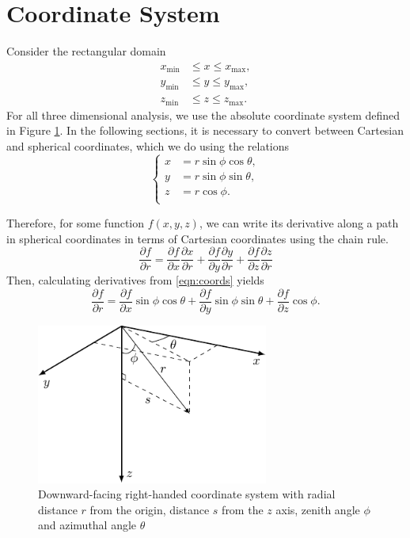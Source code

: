 \documentclass[ms,cpyr,lof,lot]{uathesis}
\newcommand\xmin{{x_{\min}}}
\newcommand\xmax{{x_{\max}}}
\newcommand\ymin{{y_{\min}}}
\newcommand\ymax{{y_{\max}}}
\newcommand\zmin{{z_{\min}}}
\newcommand\zmax{{z_{\max}}}
\begin{document}
\section{Coordinate System}
Consider the rectangular domain
\begin{align*}
  \xmin &\leq x \leq \xmax, \\
  \ymin &\leq y \leq \ymax, \\
  \zmin &\leq z \leq \zmax.
\end{align*}
For all three dimensional analysis, we use the absolute coordinate system defined in Figure \ref{fig:3dcoords}.
In the following sections, it is necessary to convert between Cartesian and spherical coordinates, which we do using the relations
\begin{equation}
  \left\{
	\begin{split}
		x & = r\sin\phi\cos\theta, \\
		y & = r\sin\phi\sin\theta, \\
		z & = r\cos\phi. \\
	\end{split}
  \right.
	\label{eqn:coords}
\end{equation}

Therefore, for some function $f(x,y,z)$, we can write its derivative along a path in spherical coordinates in terms of Cartesian coordinates using the chain rule.
\begin{equation*}
	\frac{\partial f}{\partial r} 
	=\frac{\partial f}{\partial x}\frac{\partial x}{\partial r} 
	+ \frac{\partial f}{\partial y}\frac{\partial y}{\partial r} 
	+ \frac{\partial f}{\partial z}\frac{\partial z}{\partial r}
\end{equation*}
Then, calculating derivatives from \eqref{eqn:coords} yields
\begin{equation}
	\frac{\partial f}{\partial r} 
	=\frac{\partial f}{\partial x}\sin\phi\cos\theta
	+ \frac{\partial f}{\partial y}\sin\phi\sin\theta
	+ \frac{\partial f}{\partial z}\cos\phi.
	\label{eqn:partials}
\end{equation}
\begin{figure}[H]
	\centering
	\includegraphics[width=3in]{3d_coords}
	\caption{Downward-facing right-handed coordinate system with radial distance $r$ from the origin, distance $s$ from the $z$ axis, zenith angle $\phi$ and azimuthal angle $\theta$}
	\label{fig:3dcoords}
\end{figure}
\end{document}
